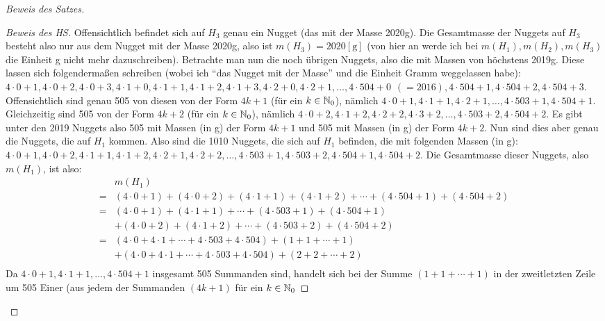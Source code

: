 \begin{proof}[Beweis des Satzes]
\begin{proof}[Beweis des HS]
        Offensichtlich befindet sich auf $H_3$ genau ein Nugget (das mit der Masse 2020g). Die Gesamtmasse der 
        Nuggets auf $H_3$ besteht also nur aus dem Nugget mit der Masse 2020g, also ist $m(H_3) = 2020 [\text{g}]$ 
        (von hier an werde ich bei $m(H_1), m(H_2), m(H_3)$ die Einheit g nicht mehr dazuschreiben). Betrachte man 
        nun die noch übrigen Nuggets, also die mit Massen von höchstens 2019g. Diese lassen sich folgendermaßen 
        schreiben (wobei ich "`das Nugget mit der Masse"' und die Einheit Gramm weggelassen habe): 
        $4\cdot 0+1, 4\cdot 0+2, 4\cdot 0+3, 4\cdot 1+0, 4\cdot 1+1, 4\cdot 1+2, 4\cdot 1+3, 4\cdot 2+0, 4\cdot 2+1, 
        \ldots, 4\cdot 504+0\hspace{5pt} (=2016), 4\cdot 504+1, 4\cdot 504+2, 4\cdot 504+3$. Offensichtlich sind 
        genau 505 von diesen von der Form $4k +1$ (für ein $k \in \mathbb{N}_0$), nämlich $4\cdot 0+1, 4\cdot 1+1, 4\cdot 2+1, 
        \ldots, 4\cdot 503+1, 4\cdot 504+1$. Gleichzeitig sind 505 von der Form $4k+2$ (für ein $k\in\mathbb{N}_0$), nämlich 
        $4\cdot 0+2, 4\cdot 1+2, 4\cdot 2+2, 4\cdot 3+2, \ldots, 4\cdot 503+2, 4\cdot 504+2$. Es gibt unter den 2019 
        Nuggets also 505 mit Massen (in g) der Form $4k+1$ und 505 mit Massen (in g) der Form $4k+2$. Nun sind dies 
        aber genau die Nuggets, die auf $H_1$ kommen.
        Also sind die 1010 Nuggets, die sich auf $H_1$ befinden, die mit folgenden Massen (in g): $4\cdot 0+1, 
        4\cdot 0+2, 4\cdot 1+1, 4\cdot 1+2, 4\cdot 2+1, 4\cdot 2+2, \ldots, 4\cdot 503+1, 4\cdot 503+2, 4\cdot 504+1, 
        4\cdot 504+2$. Die Gesamtmasse dieser Nuggets, also $m(H_1)$, ist also:
        \begin{align*}
            &m(H_1)\\
            =&(4\cdot 0+1)+(4\cdot 0+2)+(4\cdot 1+1)+(4\cdot 1+2)+\cdots+(4\cdot 504+1)+(4\cdot 504+2)\\
            = &(4\cdot 0+1)+(4\cdot1+1)+\cdots+(4\cdot 503+1)+(4\cdot 504+1)\\
            &+(4\cdot 0+2)+(4\cdot1+2)+\cdots+(4\cdot 503+2)+(4\cdot 504+2)\\
            = &(4\cdot0+4\cdot1+\cdots+4\cdot503+4\cdot504)+(1+1+\cdots+1)\\
            &+(4\cdot0+4\cdot1+\cdots+4\cdot503+4\cdot504)+(2+2+\cdots+2)\\
        \end{align*}
        Da $4\cdot0+1, 4\cdot1+1, \ldots, 4\cdot504+1$ insgesamt 505 Summanden sind, handelt sich bei der Summe
        $(1+1+\cdots+1)$ in der zweitletzten Zeile um 505 Einer (aus jedem der Summanden $(4k+1)$ für ein $k\in \mathbb{N}_0$ 

\end{proof}
\end{proof}
